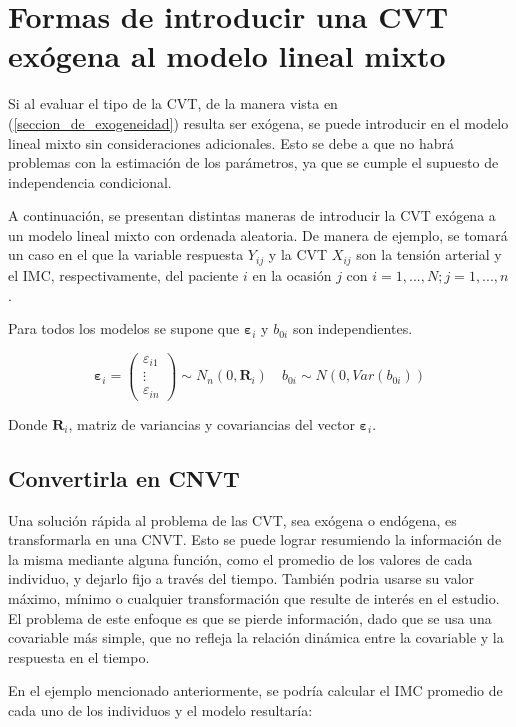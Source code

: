 \documentclass[spanish]{article}
\numberwithin{figure}{subsection}
\numberwithin{equation}{subsection}
\numberwithin{table}{subsection}
\begin{document}
\newpage

\section{Formas de introducir una CVT exógena al modelo lineal mixto}

Si al evaluar el tipo de la CVT, de la manera vista en
(\ref{seccion_de_exogeneidad}) resulta ser exógena, se puede introducir en el
modelo lineal mixto sin consideraciones adicionales. Esto se debe a que no habrá
problemas con la estimación de los parámetros, ya que se cumple el supuesto de
independencia condicional.

A continuación, se presentan distintas maneras de introducir la CVT exógena a un
modelo lineal mixto con ordenada aleatoria. De manera de ejemplo, se tomará un
caso en el que la variable respuesta $Y_{ij}$ y la CVT $X_{ij}$ son la tensión
arterial y el IMC, respectivamente, del paciente $i$ en la ocasión $j$ con
$i = 1, ..., N; j = 1, ..., n$.

Para todos los modelos se supone que $\bm{\varepsilon}_i$ y $b_{0i}$ son
independientes.

\[ 
	\bm{\varepsilon}_i = \begin{pmatrix} \varepsilon_{i1} \\ \vdots \\ \varepsilon_{in} \end{pmatrix} \sim N_{n}(0, \bm{R}_i)
	\quad
	b_{0i} \sim N(0, Var(b_{0i}))
\]

Donde $\bm{R}_i$, matriz de variancias y covariancias del vector
$\bm{\varepsilon}_{i}$.

\subsection{Convertirla en CNVT}

Una solución rápida al problema de las CVT, sea exógena o endógena, es
transformarla en una CNVT. Esto se puede lograr resumiendo la información de la
misma mediante alguna función, como el promedio de los valores de cada
individuo, y dejarlo fijo a través del tiempo. También podria usarse su valor
máximo, mínimo o cualquier transformación que resulte de interés en el estudio.
El problema de este enfoque es que se pierde información, dado que se usa una
covariable más simple, que no refleja la relación dinámica entre la covariable y
la respuesta en el tiempo.

En el ejemplo mencionado anteriormente, se podría calcular el IMC promedio de
cada uno de los individuos y el modelo resultaría:
\end{document}
